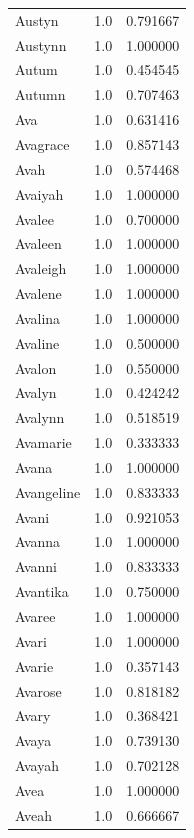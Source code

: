 \documentclass[
  letterpaper,
  DIV=11,
  numbers=noendperiod]{scrreprt}
\begin{document}
\begin{tabular}{lrr}
Austyn          &   1.0 &   0.791667 \\
Austynn         &   1.0 &   1.000000 \\
Autum           &   1.0 &   0.454545 \\
Autumn          &   1.0 &   0.707463 \\
Ava             &   1.0 &   0.631416 \\
Avagrace        &   1.0 &   0.857143 \\
Avah            &   1.0 &   0.574468 \\
Avaiyah         &   1.0 &   1.000000 \\
Avalee          &   1.0 &   0.700000 \\
Avaleen         &   1.0 &   1.000000 \\
Avaleigh        &   1.0 &   1.000000 \\
Avalene         &   1.0 &   1.000000 \\
Avalina         &   1.0 &   1.000000 \\
Avaline         &   1.0 &   0.500000 \\
Avalon          &   1.0 &   0.550000 \\
Avalyn          &   1.0 &   0.424242 \\
Avalynn         &   1.0 &   0.518519 \\
Avamarie        &   1.0 &   0.333333 \\
Avana           &   1.0 &   1.000000 \\
Avangeline      &   1.0 &   0.833333 \\
Avani           &   1.0 &   0.921053 \\
Avanna          &   1.0 &   1.000000 \\
Avanni          &   1.0 &   0.833333 \\
Avantika        &   1.0 &   0.750000 \\
Avaree          &   1.0 &   1.000000 \\
Avari           &   1.0 &   1.000000 \\
Avarie          &   1.0 &   0.357143 \\
Avarose         &   1.0 &   0.818182 \\
Avary           &   1.0 &   0.368421 \\
Avaya           &   1.0 &   0.739130 \\
Avayah          &   1.0 &   0.702128 \\
Avea            &   1.0 &   1.000000 \\
Aveah           &   1.0 &   0.666667 \\

\end{tabular}
\end{document}
